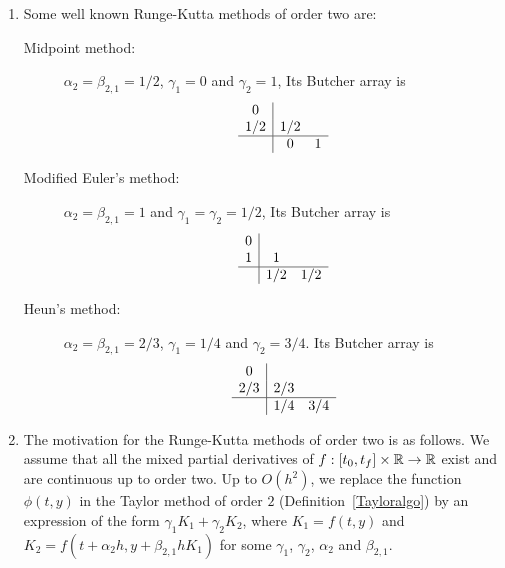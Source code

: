 \begin{rmkList}
\begin{enumerate}
\item Some well known Runge-Kutta methods of order two are:
\begin{description}
\item[Midpoint method:] $\alpha_2 = \beta_{2,1} = 1/2$, $\gamma_1=0$
and $\gamma_2=1$, 
Its Butcher array is
\[
\begin{array}{c|cc}
0 & & \\
1/2 & 1/2 & \\
\hline
 & 0 & 1
\end{array}
\]
\item[Modified Euler's method:] $\alpha_2 = \beta_{2,1} = 1$ and
$\gamma_1=\gamma_2=1/2$,
Its Butcher array is
\[
\begin{array}{c|cc}
0 & & \\
1 & 1 & \\
\hline
 & 1/2 & 1/2
\end{array}
\]
\item[Heun's method:] $\alpha_2 = \beta_{2,1}=2/3$, $\gamma_1=1/4$ and
$\gamma_2=3/4$.
Its Butcher array is
\[
\begin{array}{c|cc}
0 & & \\
2/3 & 2/3 & \\
\hline
 & 1/4 & 3/4
\end{array}
\]
\end{description}
\item The motivation for the Runge-Kutta methods of order two is as
follows.  We assume that all the mixed partial derivatives of
$f:[t_0,t_f]\times \mathbb{R} \rightarrow \mathbb{R}$ exist and are continuous up to
order two.  Up to $O(h^2)$, we replace the function $\phi(t,y)$ in the
Taylor method of order $2$ (Definition~\ref{Tayloralgo}) by an
expression of the form $\gamma_1 K_1 + \gamma_2 K_2$, where
$K_1 = f(t,y)$ and $K_2=f(t+\alpha_2 h,y+\beta_{2,1} h K_1)$ for some
$\gamma_1$, $\gamma_2$, $\alpha_2$ and $\beta_{2,1}$.


\end{enumerate}
\end{rmkList}
